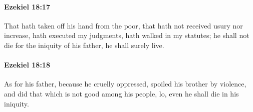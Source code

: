 		\paragraph{Ezekiel 18:17} %
			\label{EZEKIEL-18-17}

			That hath taken off his hand from the poor, that hath not received usury nor increase, hath executed my judgments, hath walked in my statutes; he shall not die for the iniquity of his father, he shall surely live.


		\paragraph{Ezekiel 18:18} %
			\label{EZEKIEL-18-18}

			As for his father, because he cruelly oppressed, spoiled his brother by violence, and did that which is not good among his people, lo, even he shall die in his iniquity.

